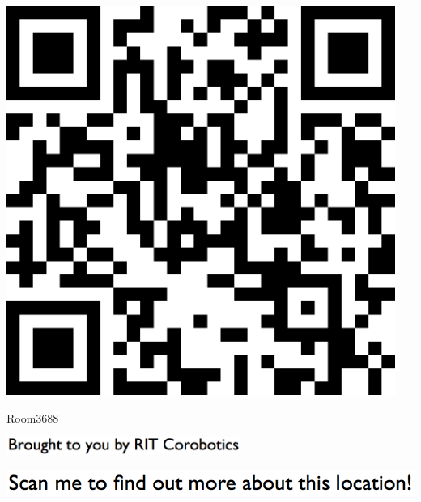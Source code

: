\documentclass[letterpaper]{article}
\begin{document}
 \begingroup 
 \centerline{\includegraphics[scale=1,width=5in,height=5in]{Room3688.png}} 
 \endgroup 
 \vspace*{\fill} 

 \hfill{\small Room3688} 

  \vspace{0.7in} 
 
 \centerline{\includegraphics[scale=1,width=3in]{text-bottom.png}} 
 
 \pagebreak 
{} 
 \vspace*{\fill} 
 
  \centerline{\includegraphics[scale=1,width=6in]{text-top.png}} 
 
 \vspace{0.5in} 
 
\end{document}
